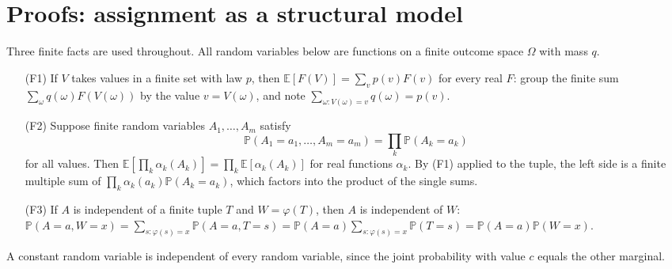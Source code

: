 \section{Proofs: assignment as a structural model}
\label{sec:annex-p15-w02b-p15-077-assignment-scm}

Three finite facts are used throughout. All random variables below are
functions on a finite outcome space \(\Omega\) with mass \(q\).
\begin{enumerate}
\item[(F1)] If \(V\) takes values in a finite set with law \(p\), then
      \(\mathbb E[F(V)]=\sum_vp(v)F(v)\) for every real \(F\): group
      the finite sum \(\sum_\omega q(\omega)F(V(\omega))\) by the value
      \(v=V(\omega)\), and note \(\sum_{\omega:V(\omega)=v}q(\omega)=p(v)\).
\item[(F2)] Suppose finite random variables \(A_1,\ldots,A_m\) satisfy
      \[
       \mathbb P(A_1=a_1,\ldots,A_m=a_m)=\prod_k\mathbb P(A_k=a_k)
      \]
      for all values. Then
      \(\mathbb E[\prod_k\alpha_k(A_k)]=\prod_k\mathbb E[\alpha_k(A_k)]\)
      for real functions \(\alpha_k\). By (F1) applied to the tuple, the
      left side is a finite multiple sum of
      \(\prod_k\alpha_k(a_k)\mathbb P(A_k=a_k)\), which factors into the
      product of the single sums.
\item[(F3)] If \(A\) is independent of a finite tuple \(T\) and
      \(W=\varphi(T)\), then \(A\) is independent of \(W\):
      \(\mathbb P(A=a,W=x)=\sum_{s:\varphi(s)=x}\mathbb P(A=a,T=s)
      =\mathbb P(A=a)\sum_{s:\varphi(s)=x}\mathbb P(T=s)
      =\mathbb P(A=a)\mathbb P(W=x)\).
\end{enumerate}
A constant random variable is independent of every random variable, since
the joint probability with value \(c\) equals the other marginal.


